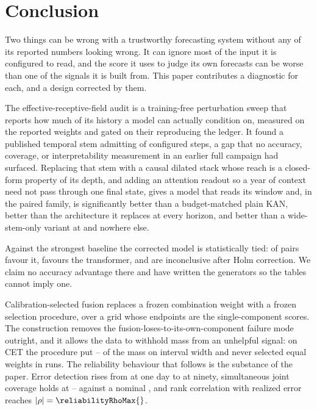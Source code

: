 \section{Conclusion}

Two things can be wrong with a trustworthy forecasting system without any of its reported numbers looking wrong. It can ignore most of the input it is configured to read, and the score it uses to judge its own forecasts can be worse than one of the signals it is built from. This paper contributes a diagnostic for each, and a design corrected by them.

The effective-receptive-field audit is a training-free perturbation sweep that reports how much of its history a model can actually condition on, measured on the reported weights and gated on their reproducing the ledger. It found a published temporal stem admitting \robustFieldPublished{} of \robustHistory{} configured steps, a gap that no accuracy, coverage, or interpretability measurement in an earlier full campaign had surfaced. Replacing that stem with a causal dilated stack whose reach is a closed-form property of its depth, and adding an attention readout so a year of context need not pass through one final state, gives a model that reads its window and, in the paired family, is significantly better than a budget-matched plain KAN, better than the architecture it replaces at every horizon, and better than a wide-stem-only variant at \pairedDilatedWinHorizons{} and nowhere else.

Against the strongest baseline the corrected model is statistically tied: \pairedTransformerWins{} of \pairedTransformerTotal{} pairs favour it, \pairedTransformerLosses{} favours the transformer, and \pairedTransformerTied{} are inconclusive after Holm correction. We claim no accuracy advantage there and have written the generators so the tables cannot imply one.

Calibration-selected fusion replaces a frozen combination weight with a frozen selection procedure, over a grid whose endpoints are the single-component scores. The construction removes the fusion-loses-to-its-own-component failure mode outright, and it allows the data to withhold mass from an unhelpful signal: on CET the procedure put \fusionWeightLow{}--\fusionWeightHigh{} of the mass on interval width and never selected equal weights in \fusionRuns{} runs. The reliability behaviour that follows is the substance of the paper. Error detection rises from \errorAurocOne{} at one day to \errorAurocNinety{} at ninety, simultaneous joint coverage holds at \simulCoverageThirty{}--\simulCoverageNinety{} against a nominal \nominalCoverage{}, and rank correlation with realized error reaches $|\rho|=\reliabilityRhoMax{}$.

